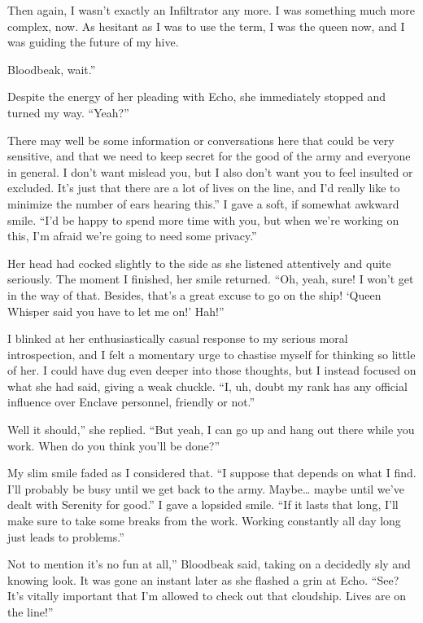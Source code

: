 Then again, I wasn’t exactly an Infiltrator any more. I was something much more complex, now. As hesitant as I was to use the term, I was the queen now, and I was guiding the future of my hive.

\leavevmode{}Bloodbeak, wait.”

Despite the energy of her pleading with Echo, she immediately stopped and turned my way. “Yeah?”

\leavevmode{}There may well be some information or conversations here that could be very sensitive, and that we need to keep secret for the good of the army and everyone in general. I don’t want mislead you, but I also don’t want you to feel insulted or excluded. It’s just that there are a lot of lives on the line, and I’d really like to minimize the number of ears hearing this.” I gave a soft, if somewhat awkward smile. “I’d be happy to spend more time with you, but when we’re working on this, I’m afraid we’re going to need some privacy.”

Her head had cocked slightly to the side as she listened attentively and quite seriously. The moment I finished, her smile returned. “Oh, yeah, sure! I won’t get in the way of that. Besides, that’s a great excuse to go on the ship! ‘Queen Whisper said you have to let me on!’ Hah!”

I blinked at her enthusiastically casual response to my serious moral introspection, and I felt a momentary urge to chastise myself for thinking so little of her. I could have dug even deeper into those thoughts, but I instead focused on what she had said, giving a weak chuckle. “I, uh, doubt my rank has any official influence over Enclave personnel, friendly or not.”

\leavevmode{}Well it should,” she replied. “But yeah, I can go up and hang out there while you work. When do you think you’ll be done?”

My slim smile faded as I considered that. “I suppose that depends on what I find. I’ll probably be busy until we get back to the army. Maybe… maybe until we’ve dealt with Serenity for good.” I gave a lopsided smile. “If it lasts that long, I’ll make sure to take some breaks from the work. Working constantly all day long just leads to problems.”

\leavevmode{}Not to mention it’s no fun at all,” Bloodbeak said, taking on a decidedly sly and knowing look. It was gone an instant later as she flashed a grin at Echo. “See? It’s vitally important that I’m allowed to check out that cloudship. Lives are on the line!”

